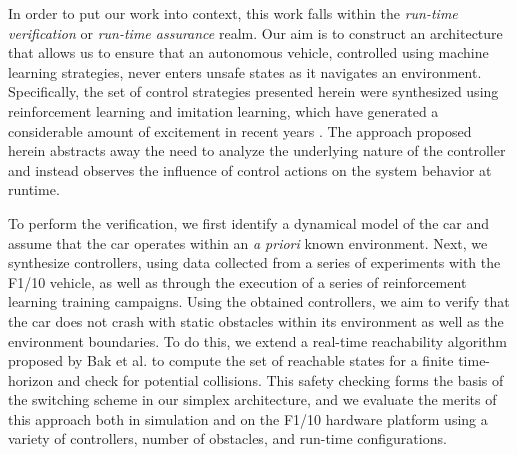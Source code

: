 \documentclass[manuscript,screen,review]{acmart}
\newcommand{\todo}[1]{\textcolor{red}{\textbf{\underline{TODO:}} #1}}
\begin{document}
In order to put our work into context, this work falls within the \textit{run-time verification} or \textit{run-time assurance} realm. Our aim is to construct an architecture that allows us to ensure that an autonomous vehicle, controlled using machine learning strategies, never enters unsafe states as it navigates an environment. Specifically, the set of control strategies presented herein were synthesized using reinforcement learning and imitation learning, which have generated a considerable amount of excitement in recent years \cite{bojarski2016end,lillicrap2015continuous}. The approach proposed herein abstracts away the need to analyze the underlying nature of the controller and instead observes the influence of control actions on the system behavior at runtime. %

To perform the verification, we first identify a dynamical model of the car and assume that the car operates within an \textit{a priori} known environment. Next, we synthesize controllers, using data collected from a series of experiments with the F1/10 vehicle, as well as through the execution of a series of reinforcement learning training campaigns. Using the obtained controllers, we aim to verify that the car does not crash with static obstacles within its environment as well as the environment boundaries. To do this, we extend a real-time reachability algorithm proposed by Bak et al. \cite{Bak2014,Johnson2016} to compute the set of reachable states for a finite time-horizon and check for potential collisions. This safety checking forms the basis of the switching scheme in our simplex architecture, and we evaluate the merits of this approach both in simulation and on the F1/10 hardware platform using a variety of controllers, number of obstacles, and run-time configurations.
\end{document}
